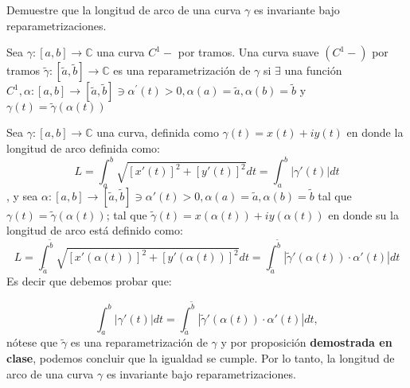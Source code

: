 \begin{problema}
    Demuestre que la longitud de arco de una curva $\gamma$ es invariante bajo reparametrizaciones.
    \begin{cajita}
        \begin{definicion}
            Sea $\gamma:[a, b] \rightarrow \mathbb{C}$ una curva $C^1-$ por tramos. Una curva suave $\left(C^1-\right)$ por tramos $\tilde{\gamma}:[\tilde{a}, \tilde{b}] \rightarrow \mathbb{C}$ es una reparametrización de $\gamma$ si $\exists$ una función $C^1, \alpha:[a, b] \rightarrow[\tilde{a}, \tilde{b}] \ni \alpha^{\prime}(t)>0, \alpha(a)=\tilde{a}, \alpha(b)=\tilde{b}$ y $\gamma(t)=\tilde{\gamma}(\alpha(t))$
        \end{definicion}
    \end{cajita}
    \begin{dem}
        Sea $\gamma:[a,b]\to\mathbb{C}$ una curva, definida como $\gamma(t)=x(t)+iy(t)$ en donde la longitud de arco definida como: 
        $$L=\int_a^b\sqrt{[x'(t)]^2+[y'(t)]^2} dt = \int_a^b|\gamma'(t)| dt $$, 
        y sea $\alpha:[a,b]\to [\tilde{a},\tilde{b}]\ni \alpha'(t)>0,\alpha(a)=\tilde{a},\alpha(b)=\tilde{b}$ tal que $\gamma(t)=\tilde{\gamma}(\alpha(t))$; tal que $\tilde{\gamma}(t)= x(\alpha(t))+iy(\alpha(t))$ en donde su la longitud de arco está definido como: 
        $$L=\int_{\tilde{a}}^{\tilde{b}}\sqrt{[x'(\alpha(t))]^2+[y'(\alpha(t))]^2}dt=\int_{\tilde{a}}^{\tilde{b}}|\tilde{\gamma}'(\alpha(t))\cdot \alpha'(t)| dt $$
        Es decir que debemos probar que: 

        $$ \int_a^b|\gamma'(t)| dt=\int_{\tilde{a}}^{\tilde{b}}|\tilde{\gamma}'(\alpha(t))\cdot \alpha'(t)| dt,$$
        nótese que $\tilde{\gamma}$ es una reparametrización de $\gamma$ y por proposición \textbf{demostrada en clase}, podemos concluir que la igualdad se cumple. Por lo tanto, la longitud de arco de una curva $\gamma$ es invariante bajo reparametrizaciones.
    \end{dem}
\end{problema}


